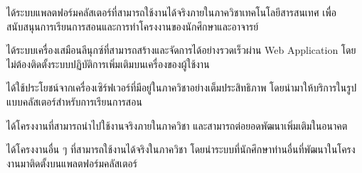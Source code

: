 \begin{mycustomenum}[label=1.4.\arabic*] %
    \item ได้ระบบแพลตฟอร์มคลัสเตอร์ที่สามารถใช้งานได้จริงภายในภาควิชาเทคโนโลยีสารสนเทศ เพื่อสนับสนุนการเรียนการสอนและการทำโครงงานของนักศึกษาและอาจารย์
    \item ได้ระบบเครื่องเสมือนลีนุกซ์ที่สามารถสร้างและจัดการได้อย่างรวดเร็วผ่าน Web Application โดยไม่ต้องติดตั้งระบบปฏิบัติการเพิ่มเติมบนเครื่องของผู้ใช้งาน
    \newpage
    \item ได้ใช้ประโยชน์จากเครื่องเซิร์ฟเวอร์ที่มีอยู่ในภาควิชาอย่างเต็มประสิทธิภาพ โดยนำมาให้บริการในรูปแบบคลัสเตอร์สำหรับการเรียนการสอน
    \item ได้โครงงานที่สามารถนำไปใช้งานจริงภายในภาควิชา และสามารถต่อยอดพัฒนาเพิ่มเติมในอนาคต
    \item ได้โครงงานอื่น ๆ ที่สามารถใช้งานได้จริงในภาควิชา โดยนำระบบที่นักศึกษาท่านอื่นที่พัฒนาในโครงงานมาติดตั้งบนแพลตฟอร์มคลัสเตอร์
\end{mycustomenum}
